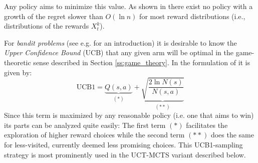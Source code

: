 Any policy aims to minimize this value. As shown in \cite{lai1985asymptotically} there exist no policy with a growth of the regret slower than $O(\ln n)$ for most reward distributions (i.e., distributions of the rewards $X^k_t$).


For \textit{bandit problems} (see e.g. \cite{lattimore2018bandit} for an introduction) it is desirable to know the \textit{Upper Confidence Bound} (UCB) that any given arm will be optimal in the game-theoretic sense described in Section \ref{ss:game_theory}. In the formulation of \cite{sironi2019comparing} it is given by:
\begin{equation}
    \text{UCB1} = \underbrace{Q(s,a)}_{(\ast)} +  \underbrace{\sqrt{\frac{2 \ln N(s)}{N(s,a)}}}_{(\ast \ast)}
\end{equation}
Since this term is maximized by any reasonable policy (i.e. one that aims to win) its parts can be analyzed quite easily: The first term $(\ast)$ facilitates the exploration of higher reward choices while the second term $(\ast \ast)$ does the same for less-visited, currently deemed less promising choices. This UCB1-sampling strategy is most prominently used in the UCT-MCTS variant described below. 
